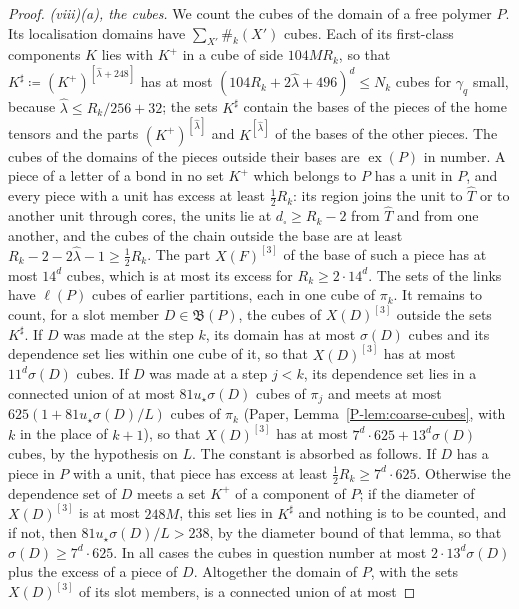 \documentclass[11pt]{preprint}
\numberwithin{equation}{section}
\theoremstyle{definition}
\theoremstyle{remark}
\theoremstyle{plain}
\begin{document}
\begin{proof}
\emph{(viii)(a), the cubes.} We count the cubes of the domain of a free polymer $P$. Its localisation domains have $\sum_{X'}\#_k(X')$ cubes. Each of its first-class components $K$ lies with $K^+$ in a cube of side $104MR_k$, so that $K^\sharp \coloneqq (K^+)^{[\hat\lambda + 248]}$ has at most $(104R_k + 2\hat\lambda + 496)^d \leq N_k$ cubes for $\gamma_q$ small, because $\hat\lambda \leq R_k/256 + 32$; the sets $K^\sharp$ contain the bases of the pieces of the home tensors and the parts $(K^+)^{[\hat\lambda]}$ and $K^{[\hat\lambda]}$ of the bases of the other pieces. The cubes of the domains of the pieces outside their bases are $\operatorname{ex}(P)$ in number. A piece of a letter of a bond in no set $K^+$ which belongs to $P$ has a unit in $P$, and every piece with a unit has excess at least $\frac12R_k$: its region joins the unit to $\hat T$ or to another unit through cores, the units lie at $d_\square \geq R_k - 2$ from $\hat T$ and from one another, and the cubes of the chain outside the base are at least $R_k - 2 - 2\hat\lambda - 1 \geq \frac12R_k$. The part $X(F)^{[3]}$ of the base of such a piece has at most $14^d$ cubes, which is at most its excess for $R_k \geq 2 \cdot 14^d$. The sets of the links have $\ell(P)$ cubes of earlier partitions, each in one cube of $\pi_k$. It remains to count, for a slot member $D \in \mathfrak B(P)$, the cubes of $X(D)^{[3]}$ outside the sets $K^\sharp$. If $D$ was made at the step $k$, its domain has at most $\sigma(D)$ cubes and its dependence set lies within one cube of it, so that $X(D)^{[3]}$ has at most $11^d\sigma(D)$ cubes. If $D$ was made at a step $j < k$, its dependence set lies in a connected union of at most $81u_\star\sigma(D)$ cubes of $\pi_j$ and meets at most $625(1 + 81u_\star\sigma(D)/L)$ cubes of $\pi_k$ (Paper, Lemma~\ref{P-lem:coarse-cubes}, with $k$ in the place of $k + 1$), so that $X(D)^{[3]}$ has at most $7^d \cdot 625 + 13^d\sigma(D)$ cubes, by the hypothesis on $L$. The constant is absorbed as follows. If $D$ has a piece in $P$ with a unit, that piece has excess at least $\frac12R_k \geq 7^d \cdot 625$. Otherwise the dependence set of $D$ meets a set $K^+$ of a component of $P$; if the diameter of $X(D)^{[3]}$ is at most $248M$, this set lies in $K^\sharp$ and nothing is to be counted, and if not, then $81u_\star\sigma(D)/L > 238$, by the diameter bound of that lemma, so that $\sigma(D) \geq 7^d \cdot 625$. In all cases the cubes in question number at most $2 \cdot 13^d\sigma(D)$ plus the excess of a piece of $D$. Altogether the domain of $P$, with the sets $X(D)^{[3]}$ of its slot members, is a connected union of at most

\end{proof}
\end{document}
